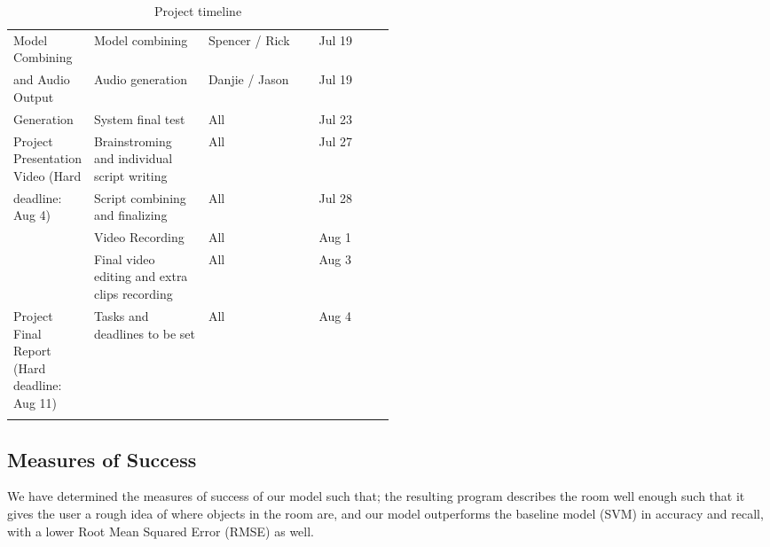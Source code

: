\documentclass{article} %
\begin{document}
\begin{longtable}{|p{0.2\linewidth}|p{0.3\linewidth}|l|l|l|}
        Model Combining & Model combining & Spencer / Rick & Jul 19 & ~ \\
        and Audio Output & Audio generation & Danjie / Jason & Jul 19 & ~ \\
        Generation & System final test & All & Jul 23 & ~ \\ \hline
        Project Presentation Video (Hard & Brainstroming and individual script writing & All & Jul 27 & ~ \\ 
        deadline: Aug 4)& Script combining and finalizing & All & Jul 28 & ~ \\ 
        ~ & Video Recording & All & Aug 1 & ~ \\ 
        ~ & Final video editing and extra clips recording & All & Aug 3 & ~ \\  \hline
        Project Final Report (Hard deadline: Aug 11) & Tasks and deadlines to be set & All & Aug 4 & ~ \\  \hline
\caption{\label{tab:timeline_table} Project timeline}
\end{longtable}



\subsection{Measures of Success}
We have determined the measures of success of our model such that; the resulting program describes the room well enough such that it gives the user a rough idea of where objects in the room are, and our model outperforms the baseline model (SVM) in accuracy and recall, with a lower Root Mean Squared Error (RMSE) as well.


\end{document}
